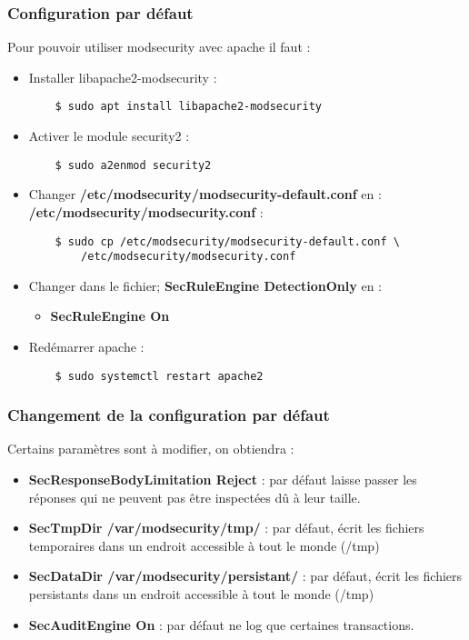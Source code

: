 \subsubsection{Configuration par défaut}
Pour pouvoir utiliser modsecurity avec apache il faut : 
\begin{itemize}
    \item Installer libapache2-modsecurity :
    \begin{verbatim}
    $ sudo apt install libapache2-modsecurity
    \end{verbatim}
    
    \item Activer le module security2 :
    \begin{verbatim}
    $ sudo a2enmod security2
    \end{verbatim}
    
    \item Changer \textbf{/etc/modsecurity/modsecurity-default.conf} en :\\  \textbf{/etc/modsecurity/modsecurity.conf} :
    \begin{verbatim}
    $ sudo cp /etc/modsecurity/modsecurity-default.conf \ 
        /etc/modsecurity/modsecurity.conf
    \end{verbatim}
    
    \item Changer dans le fichier; \textbf{SecRuleEngine DetectionOnly} en :
    \begin{itemize}
        \item \textbf{SecRuleEngine On}
    \end{itemize}
    \item Redémarrer apache :
    \begin{verbatim}
    $ sudo systemctl restart apache2
    \end{verbatim}
    
\end{itemize}
\subsubsection{Changement de la configuration par défaut}
Certains paramètres sont à modifier, on obtiendra  :
\begin{itemize}
    \item \textbf{SecResponseBodyLimitation Reject} : par défaut laisse passer les réponses qui ne peuvent pas être inspectées dû à leur taille.
    \item \textbf{SecTmpDir /var/modsecurity/tmp/} :  par défaut, écrit les fichiers temporaires dans un endroit accessible à tout le monde (/tmp)
    \item \textbf{SecDataDir /var/modsecurity/persistant/} : par défaut, écrit les fichiers persistants dans un endroit accessible à tout le monde (/tmp)
    \item \textbf{SecAuditEngine On} : par défaut ne log que certaines transactions.
\end{itemize}


